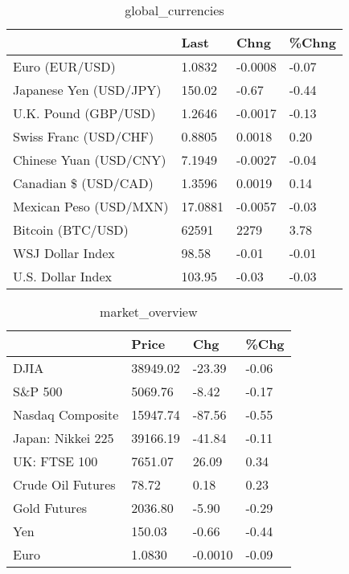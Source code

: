 \documentclass{article}%
\begin{document}
%


\begin{table}[htbp]%
\caption{global\_currencies}%
\centering%
\begin{adjustbox}{width=1\textwidth}%
\begin{tabular}{llll}
\toprule
                       &    Last &    Chng & \%Chng \\
\midrule
        Euro (EUR/USD) &  1.0832 & -0.0008 & -0.07 \\
Japanese Yen (USD/JPY) &  150.02 &   -0.67 & -0.44 \\
  U.K. Pound (GBP/USD) &  1.2646 & -0.0017 & -0.13 \\
 Swiss Franc (USD/CHF) &  0.8805 &  0.0018 &  0.20 \\
Chinese Yuan (USD/CNY) &  7.1949 & -0.0027 & -0.04 \\
  Canadian \$ (USD/CAD) &  1.3596 &  0.0019 &  0.14 \\
Mexican Peso (USD/MXN) & 17.0881 & -0.0057 & -0.03 \\
     Bitcoin (BTC/USD) &   62591 &    2279 &  3.78 \\
      WSJ Dollar Index &   98.58 &   -0.01 & -0.01 \\
     U.S. Dollar Index &  103.95 &   -0.03 & -0.03 \\
\bottomrule
\end{tabular}
%
\end{adjustbox}%
\end{table}

%


\begin{table}[htbp]%
\caption{market\_overview}%
\centering%
\begin{adjustbox}{width=1\textwidth}%
\begin{tabular}{llll}
\toprule
                  &    Price &     Chg &  \%Chg \\
\midrule
             DJIA & 38949.02 &  -23.39 & -0.06 \\
          S\&P 500 &  5069.76 &   -8.42 & -0.17 \\
 Nasdaq Composite & 15947.74 &  -87.56 & -0.55 \\
Japan: Nikkei 225 & 39166.19 &  -41.84 & -0.11 \\
     UK: FTSE 100 &  7651.07 &   26.09 &  0.34 \\
Crude Oil Futures &    78.72 &    0.18 &  0.23 \\
     Gold Futures &  2036.80 &   -5.90 & -0.29 \\
              Yen &   150.03 &   -0.66 & -0.44 \\
             Euro &   1.0830 & -0.0010 & -0.09 \\
\bottomrule
\end{tabular}
%
\end{adjustbox}%
\end{table}

%
\end{document}
